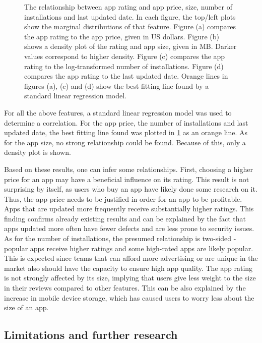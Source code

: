 \documentclass{article}
\begin{document}
\begin{figure}[ht]
\caption{The relationship between app rating and app price, size, number of installations and last updated date. In each figure, the top/left plots show the marginal distributions of that feature. Figure (a) compares the app rating to the app price, given in US dollars. Figure (b) shows a density plot of the rating and app size, given in MB. Darker values correspond to higher density. Figure (c) compares the app rating to the log-transformed number of installations. Figure (d) compares the app rating to the last updated date. Orange lines in figures (a), (c) and (d) show the best fitting line found by a standard linear regression model.}
\label{fig2} 
\end{figure}

For all the above features, a standard linear regression model was used to determine a correlation. For the app price, the number of installations and last updated date, the best fitting line found was plotted in \cref{fig2} as an orange line. As for the app size, no strong relationship could be found. Because of this, only a density plot is shown. 

Based on these results, one can infer some relationships. First, choosing a higher price for an app may have a beneficial influence on its rating. This result is not surprising by itself, as users who buy an app have likely done some research on it. Thus, the app price needs to be justified in order for an app to be profitable. Apps that are updated more frequently receive substantially higher ratings. This finding confirms already existing results \cite{freshapps} and can be explained by the fact that apps updated more often have fewer defects and are less prone to security issues. As for the number of installations, the presumed relationship is two-sided - popular apps receive higher ratings and some high-rated apps are likely popular. This is expected since teams that can afford more advertising or are unique in the market also should have the capacity to ensure high app quality. The app rating is not strongly affected by its size, implying that users give less weight to the size in their reviews compared to other features. This can be also explained by the increase in mobile device storage, which has caused users to worry less about the size of an app. 

\subsection{Limitations and further research}
\end{document}
